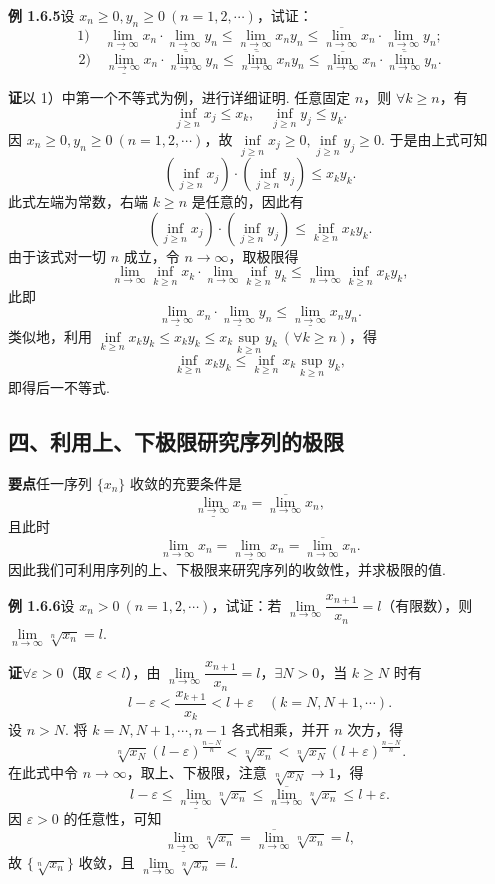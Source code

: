 \documentclass[UTF8, 12pt, fontset=fandol, oneside]{ctexart}
\begin{document}
\noindent\textbf{例 1.6.5}\quad 设 $x_n\ge0,y_n\ge0\ (n=1,2,\cdots)$，试证：
\[
  1)\quad
  \underline{\lim_{n\to\infty}}x_n\cdot\underline{\lim_{n\to\infty}}y_n
  \le \underline{\lim_{n\to\infty}}x_ny_n
  \le \overline{\lim_{n\to\infty}}x_n\cdot\underline{\lim_{n\to\infty}}y_n;
\]
\[
  2)\quad
  \underline{\lim_{n\to\infty}}x_n\cdot\overline{\lim_{n\to\infty}}y_n
  \le \overline{\lim_{n\to\infty}}x_ny_n
  \le \overline{\lim_{n\to\infty}}x_n\cdot\overline{\lim_{n\to\infty}}y_n.
\]

\noindent\textbf{证}\quad 以 1）中第一个不等式为例，进行详细证明.
任意固定 $n$，则 $\forall k\ge n$，有
\[
  \inf_{j\ge n}x_j\le x_k,\quad \inf_{j\ge n}y_j\le y_k.
\]
因 $x_n\ge0,y_n\ge0\ (n=1,2,\cdots)$，故 $\inf\limits_{j\ge n}x_j\ge0,\inf\limits_{j\ge n}y_j\ge0$. 于是由上式可知
\[
  \left(\inf_{j\ge n}x_j\right)\cdot\left(\inf_{j\ge n}y_j\right)\le x_ky_k.
\]
此式左端为常数，右端 $k\ge n$ 是任意的，因此有
\[
  \left(\inf_{j\ge n}x_j\right)\cdot\left(\inf_{j\ge n}y_j\right)
  \le \inf_{k\ge n}x_ky_k.
\]
由于该式对一切 $n$ 成立，令 $n\to\infty$，取极限得
\[
  \lim_{n\to\infty}\inf_{k\ge n}x_k\cdot\lim_{n\to\infty}\inf_{k\ge n}y_k
  \le \lim_{n\to\infty}\inf_{k\ge n}x_ky_k,
\]
此即
\[
  \underline{\lim_{n\to\infty}}x_n\cdot \underline{\lim_{n\to\infty}}y_n
  \le \underline{\lim_{n\to\infty}}x_ny_n.
\]
类似地，利用 $\inf\limits_{k\ge n}x_ky_k\le x_k y_k\le x_k\sup\limits_{k\ge n}y_k\ (\forall k\ge n)$，得
\[
  \inf_{k\ge n}x_ky_k\le \inf_{k\ge n}x_k\sup_{k\ge n}y_k,
\]
即得后一不等式.

\subsection*{四、利用上、下极限研究序列的极限}

\noindent\textbf{要点}\quad 任一序列 $\{x_n\}$ 收敛的充要条件是
\[
  \underline{\lim_{n\to\infty}}x_n=\overline{\lim_{n\to\infty}}x_n,
\]
且此时
\[
  \lim_{n\to\infty}x_n=\underline{\lim_{n\to\infty}}x_n=\overline{\lim_{n\to\infty}}x_n.
\]
因此我们可利用序列的上、下极限来研究序列的收敛性，并求极限的值.

\noindent\textbf{例 1.6.6}\quad 设 $x_n>0\ (n=1,2,\cdots)$，试证：若 $\lim\limits_{n\to\infty}\dfrac{x_{n+1}}{x_n}=l$（有限数），则 $\lim\limits_{n\to\infty}\sqrt[n]{x_n}=l$.

\noindent\textbf{证}\quad $\forall \varepsilon>0$（取 $\varepsilon<l$），由 $\lim\limits_{n\to\infty}\dfrac{x_{n+1}}{x_n}=l$，$\exists N>0$，当 $k\ge N$ 时有
\[
  l-\varepsilon<\frac{x_{k+1}}{x_k}<l+\varepsilon\quad(k=N,N+1,\cdots).
\]
设 $n>N$. 将 $k=N,N+1,\cdots,n-1$ 各式相乘，并开 $n$ 次方，得
\[
  \sqrt[n]{x_N}(l-\varepsilon)^{\frac{n-N}{n}}
  <\sqrt[n]{x_n}
  <\sqrt[n]{x_N}(l+\varepsilon)^{\frac{n-N}{n}}.
\]
在此式中令 $n\to\infty$，取上、下极限，注意 $\sqrt[n]{x_N}\to1$，得
\[
  l-\varepsilon\le \underline{\lim_{n\to\infty}}\sqrt[n]{x_n}
  \le \overline{\lim_{n\to\infty}}\sqrt[n]{x_n}\le l+\varepsilon.
\]
因 $\varepsilon>0$ 的任意性，可知
\[
  \underline{\lim_{n\to\infty}}\sqrt[n]{x_n}
  =\overline{\lim_{n\to\infty}}\sqrt[n]{x_n}=l,
\]
故 $\{\sqrt[n]{x_n}\}$ 收敛，且 $\lim\limits_{n\to\infty}\sqrt[n]{x_n}=l$.
\end{document}
